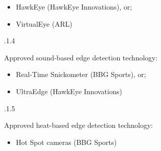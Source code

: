 \documentclass[12pt]{article}
\begin{document}
\vspace{\baselineskip}
\begin{itemize}
	\item {\fontsize{9pt}{10.8pt}\selectfont HawkEye (HawkEye Innovations), or;\par}\par


\vspace{\baselineskip}
	\item {\fontsize{9pt}{10.8pt}\selectfont VirtualEye (ARL)\par}
\end{itemize}\par


\vspace{\baselineskip}
\begin{adjustwidth}{0.49in}{0.0in}
{\fontsize{9pt}{10.8pt}.1.4 \tabto{1.17in} {\fontsize{8pt}{9.6pt}\selectfont Approved sound-based edge detection technology:\par}\par}\par

\end{adjustwidth}


\vspace{\baselineskip}
\begin{itemize}
	\item {\fontsize{9pt}{10.8pt}\selectfont Real-Time Snickometer (BBG Sports), or;\par}\par


\vspace{\baselineskip}
	\item {\fontsize{9pt}{10.8pt}\selectfont UltraEdge (HawkEye Innovations)\par}
\end{itemize}\par


\vspace{\baselineskip}
\begin{adjustwidth}{0.49in}{0.0in}
{\fontsize{9pt}{10.8pt}.1.5 \tabto{1.17in} {\fontsize{8pt}{9.6pt}\selectfont Approved heat-based edge detection technology:\par}\par}\par

\end{adjustwidth}


\vspace{\baselineskip}
\begin{itemize}
	\item {\fontsize{9pt}{10.8pt}\selectfont Hot Spot cameras (BBG Sports)\par}
\end{itemize}\par
\end{document}

